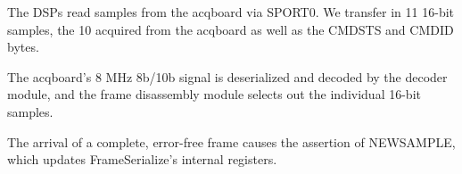 The DSPs read samples from the acqboard via SPORT0. We transfer in 11
16-bit samples, the 10 acquired from the acqboard as well as the
CMDSTS and CMDID bytes.

The acqboard's 8 MHz 8b/10b signal is deserialized and decoded by the
decoder module, and the frame disassembly module selects out the
individual 16-bit samples.

The arrival of a complete, error-free frame causes the assertion of
NEWSAMPLE, which updates FrameSerialize's internal registers.


